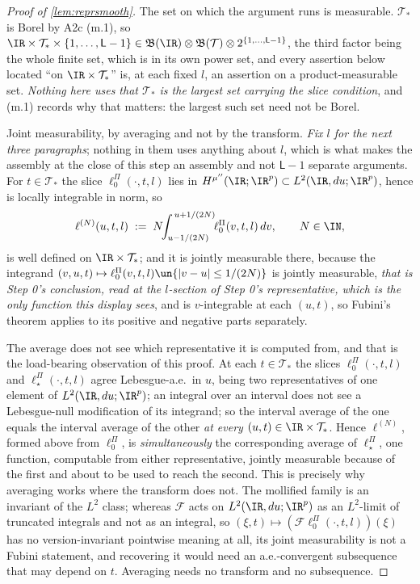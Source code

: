 \begin{proof}[Proof of \cref{lem:reprsmooth}]
The set on which the argument runs is measurable. $\mathcal T_\ast$ is Borel by A2c
\textup{(m.1)}, so
$\IR\times\mathcal T_\ast\times\{1,\dots,\mathsf L-1\}\in
\mathfrak B(\IR)\otimes\mathfrak B(\mathcal T)\otimes2^{\{1,\dots,\mathsf L-1\}}$, the third factor
being the whole finite set, which is in its own power set, and every
assertion below located ``on $\IR\times\mathcal T_\ast$'' is, at each fixed $l$, an assertion on a
product-measurable set.
\emph{Nothing here uses that $\mathcal T_\ast$ is the largest set carrying the slice condition}, and
\textup{(m.1)} records why that matters: the largest such set need not be Borel.

Joint measurability, by averaging and not by the transform. \emph{Fix $l$ for the next three
paragraphs}; nothing in them uses anything about $l$, which is what makes the assembly at the close of
this step an assembly and not $\mathsf L-1$ separate arguments. For $t\in\mathcal T_\ast$ the slice
$\ell^\Pi_0(\cdot,t,l)$ lies in $H^{\mu''}(\IR;\IR^{p})\subset L^{2}(\IR,du;\IR^{p})$, hence is locally
integrable in norm, so
\[
\ell^{(N)}(u,t,l)\;:=\;N\!\!\int_{u-1/(2N)}^{\,u+1/(2N)}\!\!\ell^\Pi_0(v,t,l)\,dv ,
\qquad N\in\IN,
\]
is well defined on $\IR\times\mathcal T_\ast$; and it is jointly measurable there, because the integrand
$(v,u,t)\mapsto\ell^\Pi_0(v,t,l)\un\{|v-u|\le1/(2N)\}$ is jointly measurable, \emph{that is Step 0's
conclusion, read at the $l$-section of Step 0's representative, which is the only function this display
sees}, and is
$v$-integrable at each $(u,t)$, so Fubini's theorem applies to its positive and negative parts
separately.

The average does not see which representative it is computed from, and that is the load-bearing
observation of this proof. At each $t\in\mathcal T_\ast$ the slices $\ell^\Pi_0(\cdot,t,l)$ and
$\ell^\Pi_\star(\cdot,t,l)$ agree Lebesgue-a.e.\ in $u$, being two representatives of one element of
$L^{2}(\IR,du;\IR^{p})$; an integral over an interval does not see a Lebesgue-null modification of its integrand;
so the interval average of the one equals the interval average of the other \emph{at every}
$(u,t)\in\IR\times\mathcal T_\ast$. Hence $\ell^{(N)}$, formed above from $\ell^\Pi_0$, is
\emph{simultaneously} the corresponding average of $\ell^\Pi_\star$, one function, computable from
either representative, jointly measurable because of the first and about to be used to reach the second.
This is precisely why averaging works where the transform does not. The mollified family
is an invariant of the $L^{2}$ class; whereas $\mathcal F$ acts on $L^{2}(\IR,du;\IR^{p})$ as an $L^{2}$-limit of
truncated integrals and not as an integral, so
$(\xi,t)\mapsto(\mathcal F\ell^\Pi_0(\cdot,t,l))(\xi)$ has no version-invariant pointwise meaning at all,
its joint measurability is not a Fubini statement, and recovering it would need an a.e.-convergent
subsequence that may depend on $t$. Averaging needs no transform and no subsequence.


\end{proof}

